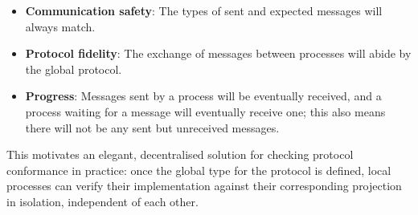 \begin{itemize}
\item \textbf{Communication safety}: The types of sent and expected messages will always match.
\item \textbf{Protocol fidelity}: The exchange of messages between processes will abide by the global protocol.
\item \textbf{Progress}: Messages sent by a process will be eventually received, and a process waiting for a message will eventually receive one; this also means there will not be any sent but unreceived messages.
\end{itemize}

This motivates an elegant, decentralised solution for checking protocol conformance in practice: once the global type for the protocol is defined, local processes can verify their implementation against their corresponding projection in isolation, independent of each other. 

%
